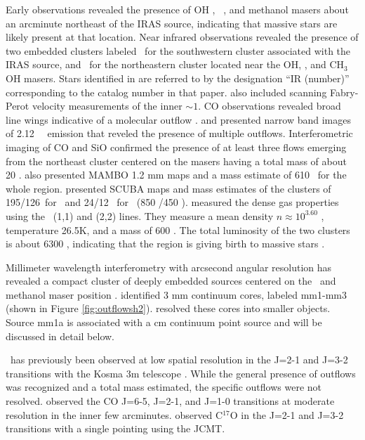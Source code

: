 Early observations revealed the presence of OH \citep{Wouterloot1993}, \HtwoO\ 
\citep{Scalise1989, Henning1992}, and methanol \citep{Menten1991} masers about
an arcminute northeast of the IRAS source, indicating that massive stars are 
likely present at that location.  Near infrared observations revealed
the presence of two embedded clusters  \citep{porras2000,jiang2001} labeled
\swcluster\ for the southwestern cluster associated with the IRAS source, and \necluster\ 
for the northeastern cluster located near the OH, \HtwoO, and CH$_3$OH masers.
Stars identified in \citet{porras2000} are referred to by the designation
``IR (number)'' corresponding to the catalog number in that paper.
\citet{porras2000} also included scanning Fabry-Perot velocity measurements of
the inner $\sim1$\arcmin.  CO observations revealed broad line wings indicative
of a molecular outflow \citep{casoli1986,shepherd1996}.  \citet{kumar2002} and
\citet{khanzadyan2004} presented narrow band images of 2.12 \um\ \htwo\
emission that reveled the presence of multiple outflows.  Interferometric
imaging of CO and SiO confirmed the presence of at least three flows emerging
from the northeast cluster centered on the masers \citep{beuther2002} having a
total mass of about 20 \msun .  \citet{beuther2002} also presented MAMBO 1.2 mm
maps and a mass estimate of 610 \msun\ for the whole region.
\citet{williams2004} presented SCUBA maps and mass estimates of the clusters of
195/126\msun\ for \necluster\ and 24/12 \msun\ for \swcluster\ (850 \um/450 \um).
\citet{Zinchenko1997} measured the dense gas properties using the \ammonia\
(1,1) and (2,2) lines.  They measure a mean density $n \approx 10^{3.60}$ \percc,
temperature 26.5K, and a mass of 600 \msun .  The total luminosity of the two
clusters is about 6300 \lsun , indicating that the region is giving birth to
massive stars \citep{porras2000}. 

Millimeter wavelength interferometry with arcsecond angular resolution has
revealed a compact cluster of deeply embedded sources centered on the \HtwoO\
and methanol maser position \citep{beuther2002,beuther2007,leurini2007}.
\citet{beuther2002} identified 3 mm continuum cores, labeled mm1-mm3 (shown in
Figure \ref{fig:outflowsh2}).  \citet{beuther2007} resolved these cores into
smaller objects.  Source mm1a is associated with a cm continuum point source
and will be discussed in detail below.

\region\ has previously been observed at low spatial resolution in the J=2-1 and J=3-2
transitions with the Kosma 3m telescope \citep{Mao2004}.  While the general presence
of outflows was recognized and a total mass estimated, the specific outflows were not 
resolved.  \citet{beuther2002} observed the CO J=6-5, J=2-1, and J=1-0
transitions at moderate resolution in the inner few arcminutes.
\citet{Thomas2008} observed C$^{17}$O in the J=2-1 and J=3-2 transitions with a
single pointing using the JCMT.



